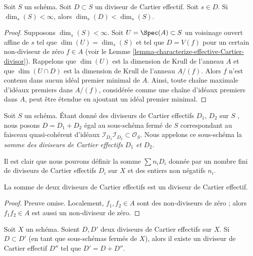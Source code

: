 \begin{lemma}
\label{lemma-effective-Cartier-makes-dimension-drop}
Soit  $S$  un schéma. Soit  $D \subset S$  un diviseur de Cartier effectif.
Soit  $s \in D$. Si  $\dim_s(S) < \infty$, alors  $\dim_s(D) < \dim_s(S)$.
\end{lemma}

\begin{proof}
Supposons  $\dim_s(S) < \infty$. Soit  $U = \Spec(A) \subset S$  un voisinage ouvert affine de
 $s$  tel que  $\dim(U) = \dim_s(S)$  et tel que  $D = V(f)$  pour un certain
non-diviseur de zéro  $f \in A$  (voir le Lemme  \ref{lemma-characterize-effective-Cartier-divisor}). Rappelons que  $\dim(U)$  est
la dimension de Krull de l'anneau  $A$  et que  $\dim(U \cap D)$  est la
dimension de Krull de l'anneau  $A/(f)$. Alors  $f$  n'est contenu dans
aucun idéal premier minimal de  $A$. Ainsi, toute chaîne maximale d'idéaux
premiers dans  $A/(f)$, considérée comme une chaîne d'idéaux premiers dans
 $A$, peut être étendue en ajoutant un idéal premier minimal.
\end{proof}

\begin{definition}
\label{definition-sum-effective-Cartier-divisors}
Soit  $S$  un schéma. Étant donné des diviseurs de Cartier effectifs
 $D_1$,  $D_2$  sur  $S$ , nous posons  $D = D_1 + D_2$  égal au
sous-schéma fermé de  $S$  correspondant au faisceau quasi-cohérent
d'idéaux  $\mathcal{I}_{D_1}\mathcal{I}_{D_2} \subset \mathcal{O}_S$. Nous appelons ce sous-schéma la  {\it  somme
des diviseurs de Cartier effectifs  $D_1$  et  $D_2$}.
\end{definition}

\noindent
Il est clair que nous pouvons définir la somme  $\sum n_iD_i$  donnée par un nombre
fini de diviseurs de Cartier effectifs  $D_i$  sur  $X$  et des
entiers non négatifs  $n_i$.

\begin{lemma}
\label{lemma-sum-effective-Cartier-divisors}
La somme de deux diviseurs de Cartier effectifs est un diviseur de Cartier
effectif.
\end{lemma}

\begin{proof}
 Preuve omise. Localement,  $f_1, f_2 \in A$  sont des non-diviseurs de zéro ; alors
 $f_1f_2 \in A$  est aussi un non-diviseur de zéro.
\end{proof}

\begin{lemma}
\label{lemma-difference-effective-Cartier-divisors}
Soit  $X$  un schéma. Soient  $D, D'$  deux diviseurs de Cartier
effectifs sur  $X$. Si  $D \subset D'$  (en tant que sous-schémas fermés de
 $X$), alors il existe un diviseur de Cartier effectif  $D''$  tel
que  $D' = D + D''$.
\end{lemma}


